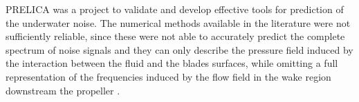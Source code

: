 \documentclass[10pt,a4paper,twoside]{article}
\begin{document}
PRELICA was a project to validate and develop effective tools for prediction of the underwater noise. The numerical methods available  in the literature were not sufficiently reliable, since these were not able to accurately predict the complete spectrum of noise signals and they can only describe the pressure field induced by the interaction between the fluid and the blades surfaces, while omitting a full representation of the frequencies induced by the flow field in the wake region downstream the propeller \cite{news-events}.





\end{document}
